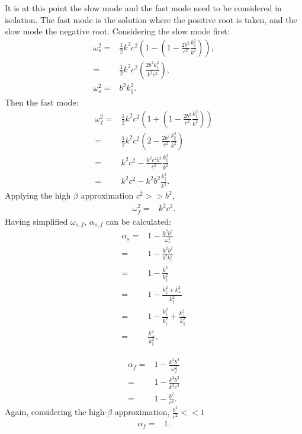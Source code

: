 \documentclass[a4paper,12pt,fourier,authoryear,custommargin]{Classes/PhDThesisPSnPDF}
\begin{document}
It is at this point the slow mode and the fast mode need to be considered in isolation.
The fast mode is the solution where the positive root is taken, and the slow mode the negative root.
Considering the slow mode first:
\begin{align}
    \omega^2_{s} =& \frac{1}{2}k^2c^2\left(1 - \left(1 - \frac{2b^2}{c^2} \frac{k^2_\parallel}{k^2}\right)\right),\\
    =& \frac{1}{2}k^2c^2\left(\frac{2b^2k^2_\parallel}{k^2c^2}\right),\\
    \omega^2_{s} =& b^2k^2_\parallel.
\end{align}
Then the fast mode:
\begin{align}
    \omega^2_{f} =& \frac{1}{2}k^2c^2\left(1 + \left(1 - \frac{2b^2}{c^2} \frac{k^2_\parallel}{k^2}\right)\right)\\
                 =& \frac{1}{2}k^2c^2\left(2 - \frac{2b^2}{c^2} \frac{k^2_\parallel}{k^2}\right)\\
                 =& k^2c^2 - \frac{k^2c^2b^2}{c^2}\frac{k^2_\parallel}{k^2}\\
                 =& k^2c^2 - k^2b^2\frac{k^2_\parallel}{k^2}.
\end{align}
Applying the high $\beta$ approximation $c^2 >> b^2$,
\begin{align}
   \omega^2_{f} =& k^2c^2.
\end{align}
Having simplified $\omega_{s,f}$, $\alpha_{s,f}$ can be calculated:
\begin{align}
    \alpha_s =& 1 - \frac{k^2b^2}{\omega^2_s}\\
             =& 1 - \frac{k^2b^2}{b^2k_\parallel^2}\\
             =& 1 - \frac{k^2}{k_\parallel^2}\\
             =& 1 - \frac{k^2_\parallel + k^2_\perp}{k^2_\parallel}\\
             =& 1 - \frac{k_\parallel^2}{k_\parallel^2} + \frac{k^2_\perp}{k^2_\parallel}\\
             =& \frac{k^2_\perp}{k^2_\parallel},
\end{align}

\begin{align}
    \alpha_f =& 1 - \frac{k^2b^2}{\omega^2_f}\\
    =& 1 - \frac{k^2b^2}{k^2c^2}\\
    =& 1 - \frac{b^2}{c^2}.
\end{align}
Again, considering the high-$\beta$ approximation, $\displaystyle\frac{b^2}{c^2} << 1$
\begin{align}
    \alpha_f =& 1.
\end{align}
\end{document}
